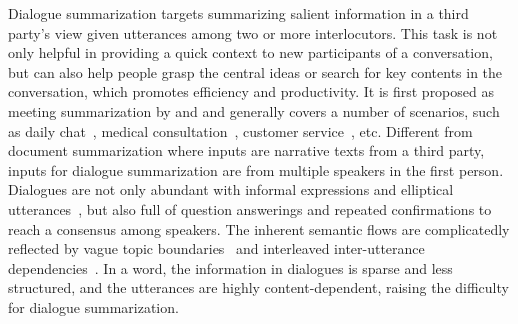 Dialogue summarization targets summarizing salient information in a third party's view given utterances among two or 
more interlocutors. 
This task is not only helpful in providing a quick context to new participants of a conversation, 
but can also help people grasp the central ideas or search for key contents in the conversation, which promotes efficiency and
productivity. 
It is first proposed as meeting summarization by \citet{carletta2005ami} and \citet{janin2003icsi} and generally
covers a number of scenarios, such as daily chat~\cite{gliwa2019samsum}, 
medical consultation~\cite{joshi2020dr}, customer service~\cite{zou2021topic}, etc.
Different from document summarization where inputs are narrative texts from a third party, inputs for dialogue summarization are from multiple speakers in the first person. 
Dialogues are not only abundant with informal expressions and elliptical utterances~\cite{zhang2020filling,liu2020incomplete},
but also full of question answerings and repeated confirmations to reach a consensus among speakers.
The inherent semantic flows are complicatedly reflected by vague topic boundaries~\cite{takanobu2018weakly} and
interleaved inter-utterance dependencies~\cite{afantenos2015discourse}. 
In a word, the information in dialogues is sparse and less structured, and the utterances are highly content-dependent, raising the difficulty for dialogue summarization.



